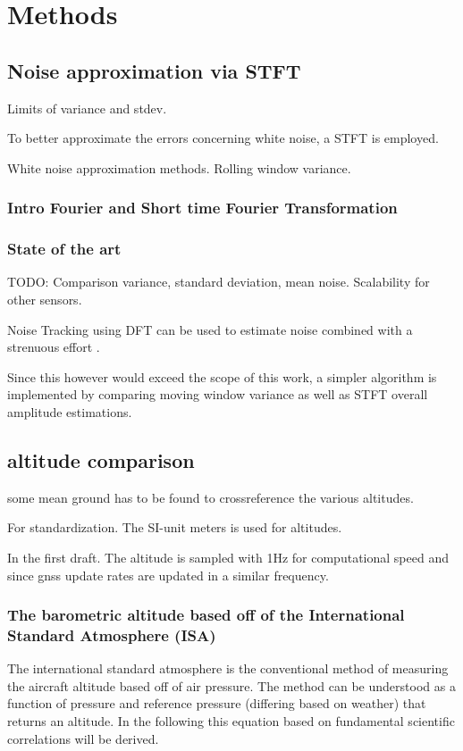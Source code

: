 \chapter{Methods}


\section{Noise approximation via STFT}

Limits of variance and stdev.

To better approximate the errors concerning white noise, a STFT is employed.

White noise approximation methods. Rolling window variance.

\subsection{Intro Fourier and Short time Fourier Transformation}

\subsection{State of the art}
TODO: Comparison variance, standard deviation, mean noise. Scalability for other sensors.

Noise Tracking using DFT can be used to estimate noise combined with a strenuous effort \cite{hendriks_noise_2008}.

Since this however would exceed the scope of this work, a simpler algorithm is implemented by comparing moving window variance as well as STFT overall amplitude estimations.


\section{altitude comparison}

some mean ground has to be found to crossreference the various altitudes.

For standardization. The SI-unit meters is used for altitudes.

In the first draft. The altitude is sampled with 1Hz for computational speed and since gnss update rates are updated in a similar frequency.

\subsection{The barometric altitude based off of the International Standard Atmosphere (ISA) \cite{iso_standard_1975}}
The international standard atmosphere is the conventional method of measuring the aircraft altitude based off of air pressure. The method can be understood as a function of pressure and reference pressure (differing based on weather) that returns an altitude. In the following this equation based on fundamental scientific correlations will be derived.

